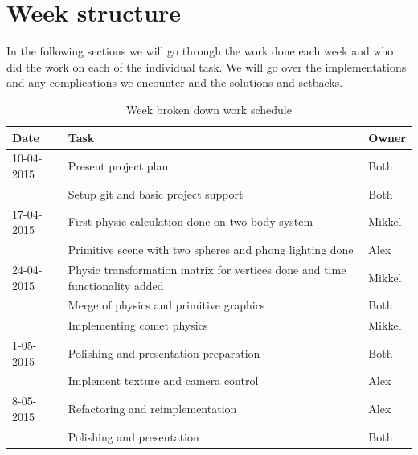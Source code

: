 \section{Week structure}
In the following sections we will go through the work done each week and who did the work on each of the individual task. We will go over the implementations and any complications we encounter and the solutions and setbacks. 
\begin{table}[h]
\begin{tabular}{|l|l|l|}
\hline
Date & Task & Owner\\
\hline
10-04-2015 & Present project plan & Both\\
 & Setup git and basic project support & Both\\
\hline
17-04-2015 & First physic calculation done on two body system & Mikkel\\
 & Primitive scene with two spheres and phong lighting done & Alex\\
\hline
24-04-2015 & Physic transformation matrix for vertices done and time functionality added &	Mikkel\\
 & Merge of physics and primitive graphics & Both\\
 & Implementing comet physics & Mikkel\\
\hline
1-05-2015 & Polishing and presentation preparation & Both\\
 & Implement texture and camera control & Alex\\	
\hline
8-05-2015 & Refactoring and reimplementation & Alex\\
 & Polishing and presentation & Both\\
\hline
\end{tabular}
\caption{Week broken down work schedule}
\label{tabWeek}
\end{table}
